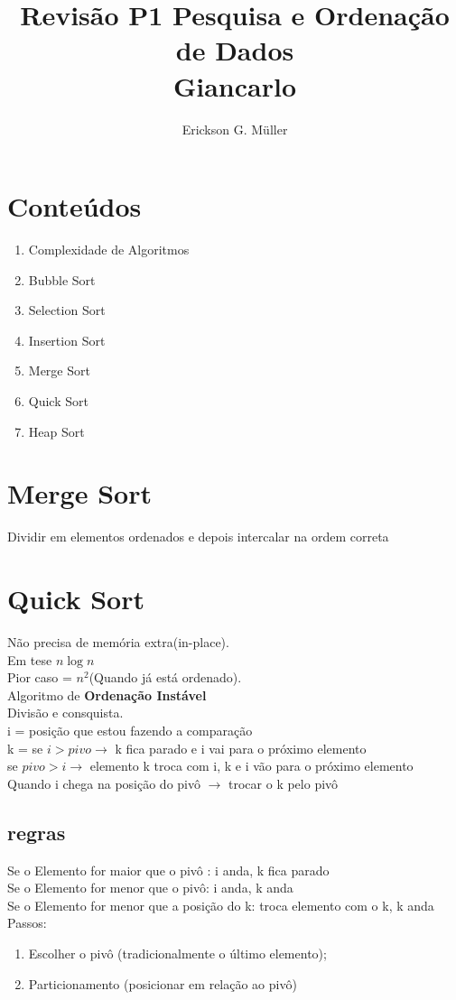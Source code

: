 \documentclass[•]{article}
\title{Revisão P1 Pesquisa e Ordenação de Dados\\Giancarlo}
\author{Erickson G. Müller}
\begin{document}
	\maketitle
	\section{Conteúdos}
		\begin{enumerate}
			\item Complexidade de Algoritmos
			\item Bubble Sort
			\item Selection Sort
			\item Insertion Sort
			\item Merge Sort
			\item Quick Sort
			\item Heap Sort
		\end{enumerate}
	\newpage
		
	\section{Merge Sort}	
		\begin{center}
			Dividir em elementos ordenados  e depois intercalar na ordem correta
		\end{center}
	\section{Quick Sort}
		Não precisa de memória extra(in-place).\\
		Em tese $n \log n$\\
		Pior caso = $n^2$(Quando já está ordenado).\\
		Algoritmo de \textbf{Ordenação Instável}\\
		Divisão e consquista.\\
		i = posição que estou fazendo a comparação\\
		k = 
		se $i>pivo \to$ k fica parado e i vai para o próximo elemento\\
		se $pivo>i \to$ elemento k troca com i, k e i vão para o próximo elemento\\
		Quando i chega na posição do pivô $\to$ trocar o k pelo pivô
		\subsection{regras}
		Se o Elemento for maior que o pivô	: i anda, k fica parado\\
		Se o Elemento for menor que o pivô: i anda, k anda\\
		Se o Elemento for menor que a posição do k: troca elemento com o k, k anda
		Passos:
		\begin{enumerate}
			\item Escolher o pivô (tradicionalmente o último elemento);
			\item Particionamento (posicionar em relação ao pivô)
			
			
		\end{enumerate}
\end{document}
